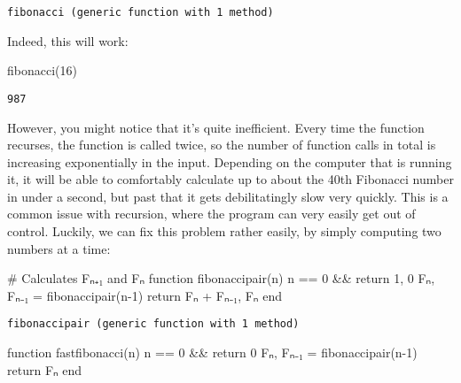 \documentclass[
  letterpaper,
  DIV=11,
  numbers=noendperiod]{scrreprt}
\newenvironment{Shaded}{\begin{snugshade}}{\end{snugshade}}
\newcommand{\CommentTok}[1]{\textcolor[rgb]{0.37,0.37,0.37}{#1}}
\newcommand{\ControlFlowTok}[1]{\textcolor[rgb]{0.00,0.23,0.31}{#1}}
\newcommand{\FloatTok}[1]{\textcolor[rgb]{0.68,0.00,0.00}{#1}}
\newcommand{\FunctionTok}[1]{\textcolor[rgb]{0.28,0.35,0.67}{#1}}
\newcommand{\KeywordTok}[1]{\textcolor[rgb]{0.00,0.23,0.31}{#1}}
\newcommand{\NormalTok}[1]{\textcolor[rgb]{0.00,0.23,0.31}{#1}}
\newcommand{\OperatorTok}[1]{\textcolor[rgb]{0.37,0.37,0.37}{#1}}
\begin{document}
\begin{verbatim}
fibonacci (generic function with 1 method)
\end{verbatim}

Indeed, this will work:

\begin{Shaded}
\begin{Highlighting}[]
\FunctionTok{fibonacci}\NormalTok{(}\FloatTok{16}\NormalTok{)}
\end{Highlighting}
\end{Shaded}

\begin{verbatim}
987
\end{verbatim}

However, you might notice that it's quite inefficient. Every time the
function recurses, the function is called twice, so the number of
function calls in total is increasing exponentially in the input.
Depending on the computer that is running it, it will be able to
comfortably calculate up to about the 40th Fibonacci number in under a
second, but past that it gets debilitatingly slow very quickly. This is
a common issue with recursion, where the program can very easily get out
of control. Luckily, we can fix this problem rather easily, by simply
computing two numbers at a time:

\begin{Shaded}
\begin{Highlighting}[]
\CommentTok{\# Calculates Fₙ₊₁ and Fₙ}
\KeywordTok{function} \FunctionTok{fibonaccipair}\NormalTok{(n)}
\NormalTok{    n }\OperatorTok{==} \FloatTok{0} \OperatorTok{\&\&} \ControlFlowTok{return} \FloatTok{1}\NormalTok{, }\FloatTok{0}
\NormalTok{    Fₙ, Fₙ₋₁ }\OperatorTok{=} \FunctionTok{fibonaccipair}\NormalTok{(n}\OperatorTok{{-}}\FloatTok{1}\NormalTok{)}
    \ControlFlowTok{return}\NormalTok{ Fₙ }\OperatorTok{+}\NormalTok{ Fₙ₋₁, Fₙ}
\KeywordTok{end}
\end{Highlighting}
\end{Shaded}

\begin{verbatim}
fibonaccipair (generic function with 1 method)
\end{verbatim}

\begin{Shaded}
\begin{Highlighting}[]
\KeywordTok{function} \FunctionTok{fastfibonacci}\NormalTok{(n)}
\NormalTok{    n }\OperatorTok{==} \FloatTok{0} \OperatorTok{\&\&} \ControlFlowTok{return} \FloatTok{0}
\NormalTok{    Fₙ, Fₙ₋₁ }\OperatorTok{=} \FunctionTok{fibonaccipair}\NormalTok{(n}\OperatorTok{{-}}\FloatTok{1}\NormalTok{)}
    \ControlFlowTok{return}\NormalTok{ Fₙ}
\KeywordTok{end}
\end{Highlighting}
\end{Shaded}
\end{document}
